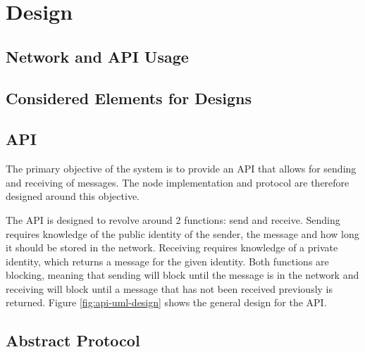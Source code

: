 \section{Design} \label{design}

	\subsection{Network and API Usage}
		
	\subsection{Considered Elements for Designs}
		
		
	\subsection{API}
		The primary objective of the system is to provide an API that allows for sending and receiving of messages. The node implementation and protocol are therefore designed around this objective.
		
		The API is designed to revolve around 2 functions: send and receive. Sending requires knowledge of the public identity of the sender, the message and how long it should be stored in the network. Receiving requires knowledge of a private identity, which returns a message for the given identity. Both functions are blocking, meaning that sending will block until the message is in the network and receiving will block until a message that has not been received previously is returned. Figure \ref{fig:api-uml-design} shows the general design for the API.
	\subsection{Abstract Protocol}
			
			